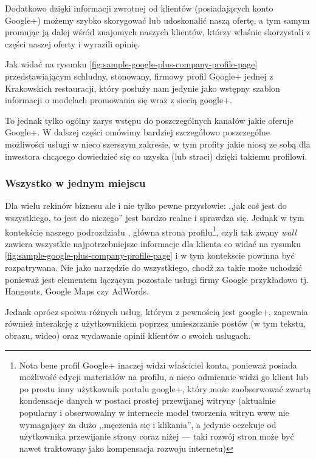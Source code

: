 \noindent Dodatkowo dzięki informacji zwrotnej od klientów (posiadających konto Google+) możemy szybko skorygować lub udoskonalić naszą ofertę, a tym samym promując ją dalej wśród znajomych naszych klientów, którzy właśnie skorzystali z części naszej oferty i wyrazili opinię. 

Jak widać na rysunku \ref{fig:sample-google-plus-company-profile-page} przedstawiającym schludny, stonowany, firmowy profil Google+ jednej z Krakowskich restauracji, który posłuży nam jedynie jako wstępny szablon informacji o modelach promowania się wraz z siecią google+.

To jednak tylko ogólny zarys wstępu do poszczególnych kanałów jakie oferuje Google+. W dalszej części omówimy bardziej szczegółowo poszczególne możliwości usługi w nieco szerszym zakresie, w tym profity jakie niosą ze sobą dla inwestora chcącego dowiedzieć się co uzyska (lub straci) dzięki takiemu profilowi.

\subsubsection{\nmu Wszystko w jednym miejscu}
\label{subsubsec:wszystko-w-jednym-miejscu}
Dla wielu rekinów biznesu ale i nie tylko pewne przysłowie: ,,jak coś jest  do wszystkiego, to jest do niczego'' jest bardzo realne i sprawdza się. Jednak w tym kontekście naszego podrozdziału , główna strona profilu\footnote{Nota bene profil Google+ inaczej widzi właściciel konta, ponieważ posiada możliwość edycji materiałów na profilu, a nieco odmiennie widzi go klient lub po prostu inny użytkownik portalu google+, który może zaobserwować zwartą kondensacje danych w postaci prostej przewijanej witryny (aktualnie popularny i obserwowalny w internecie model tworzenia witryn www nie wymagający za dużo ,,męczenia się i klikania'', a jedynie oczekuje od użytkownika przewijanie strony coraz niżej --- taki rozwój stron może być nawet traktowany jako kompensacja rozwoju internetu)}, czyli tak zwany \textit{wall} zawiera wszystkie najpotrzebniejsze informacje dla klienta co widać na rysunku \ref{fig:sample-google-plus-company-profile-page} i w tym kontekscie powinna być rozpatrywana. Nie jako narzędzie do wszystkiego, chodź za takie może uchodzić ponieważ jest elementem łączącym pozostałe usługi firmy Google przykładowo tj. Hangouts, Google Maps czy AdWords. 

\noindent Jednak oprócz spoiwa różnych usług, którym z pewnością jest google+, zapewnia również interakcję z użytkownikiem poprzez umieszczanie postów (w tym tekstu, obrazu, wideo) oraz wydawanie opinii klientów o swoich usługach. 

